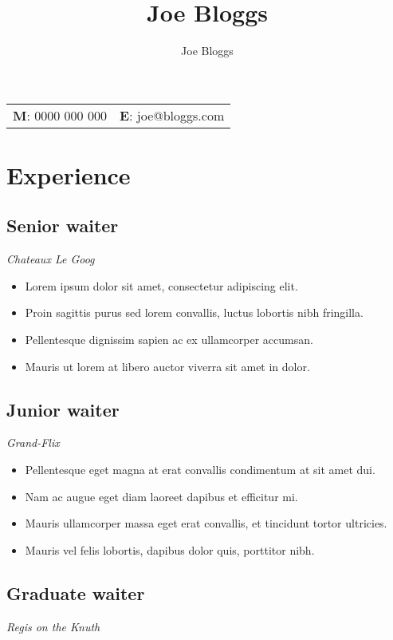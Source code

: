 \documentclass[a4paper,11pt]{article}
\author{Joe Bloggs}
\date{}
\title{Joe Bloggs}
\renewcommand{\maketitle}{{\centering {\color{myaccent}\huge\bfseries\theauthor}\par \vspace{4pt}}}
\begin{document}
\maketitle
\begin{center}
\begin{tabular}{ll}
\textbf{M}: 0000 000 000 & \textbf{E}: joe@bloggs.com\\
\end{tabular}
\end{center}

\section*{Experience}
\label{sec:orgff68f7b}
\subsection*{Senior waiter  \hfill{}  }
\label{sec:org986d293}
\emph{Chateaux Le Goog}

\begin{itemize}
\item Lorem ipsum dolor sit amet, consectetur adipiscing elit.
\item Proin sagittis purus sed lorem convallis, luctus lobortis nibh fringilla.
\item Pellentesque dignissim sapien ac ex ullamcorper accumsan.
\item Mauris ut lorem at libero auctor viverra sit amet in dolor.
\end{itemize}

\subsection*{Junior waiter  \hfill{}  }
\label{sec:org3aa34c3}
\emph{Grand-Flix}

\begin{itemize}
\item Pellentesque eget magna at erat convallis condimentum at sit amet dui.
\item Nam ac augue eget diam laoreet dapibus et efficitur mi.
\item Mauris ullamcorper massa eget erat convallis, et tincidunt tortor ultricies.
\item Mauris vel felis lobortis, dapibus dolor quis, porttitor nibh.
\end{itemize}

\subsection*{Graduate waiter  \hfill{}  }
\label{sec:org2812ed1}
\emph{Regis on the Knuth}
\end{document}
